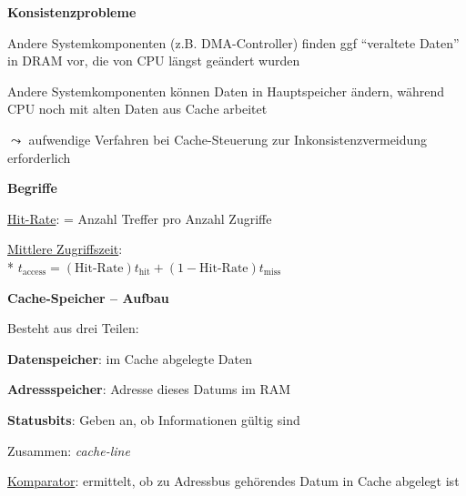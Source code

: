 \textbf{Konsistenzprobleme}
\begin{items}
	\item Andere Systemkomponenten (z.B. DMA-Controller) finden ggf "`veraltete Daten"' in DRAM vor, die von CPU längst geändert wurden
	\item Andere Systemkomponenten können Daten in Hauptspeicher ändern, während CPU noch mit alten Daten aus Cache arbeitet
	\item \( \leadsto \) aufwendige Verfahren bei Cache-Steuerung zur Inkonsistenzvermeidung erforderlich
\end{items}

\textbf{Begriffe}
\begin{items}
	\item \underline{Hit-Rate}: = Anzahl Treffer pro Anzahl Zugriffe
	\item \underline{Mittlere Zugriffszeit}: \\*
		\( t_{\text{access}} = (\text{Hit-Rate})t_\text{hit}+(1-\text{Hit-Rate})t_\text{miss} \)
\end{items}

\textbf{Cache-Speicher -- Aufbau}
\begin{items}
	\item Besteht aus drei Teilen:
	\begin{enumeration}
		\item \textbf{Datenspeicher}: im Cache abgelegte Daten
		\item \textbf{Adressspeicher}: Adresse dieses Datums im RAM
		\item \textbf{Statusbits}: Geben an, ob Informationen gültig sind
	\end{enumeration}
	\item Zusammen: \emph{cache-line}
	\item \underline{Komparator}: ermittelt, ob zu Adressbus gehörendes Datum in Cache abgelegt ist
\end{items}